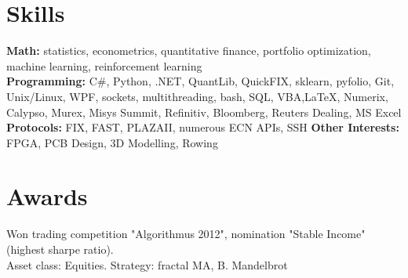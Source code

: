 \documentclass[letterpaper,hidelinks]{article}
\newcommand{\resumeSubHeadingListStart}{\begin{itemize}[leftmargin=0.1in, label={}]}
\newcommand{\resumeSubHeadingListEnd}{\end{itemize}}
\begin{document}
\vspace{-11pt}
\section{Skills}
\resumeSubHeadingListStart
\small{\item{
              \textbf{{Math:}}{ statistics, econometrics, quantitative finance, portfolio optimization, machine learning, reinforcement learning\\} %
              \textbf{{Programming:}}{ C\#, Python, .NET, QuantLib, QuickFIX, sklearn, pyfolio, Git, Unix/Linux, WPF, sockets, multithreading, bash, SQL, VBA,\LaTeX, Numerix, Calypso, Murex, Misys Summit, Refinitiv, Bloomberg, Reuters Dealing, MS Excel \\} %
              \textbf{{Protocols:}}{ FIX, FAST, PLAZAII, numerous ECN APIs, SSH } %
              \textbf{{Other Interests:}}{ FPGA, PCB Design, 3D Modelling, Rowing} %
        }}

\resumeSubHeadingListEnd
\vspace{-12pt}
\section{Awards}
\begin{description}%
  \item{Won trading competition "Algorithmus 2012", nomination "Stable Income" (highest sharpe ratio). \\Asset class: Equities. Strategy: fractal MA, B. Mandelbrot}  
\vspace{-3pt}
\end{description}
\end{document}
